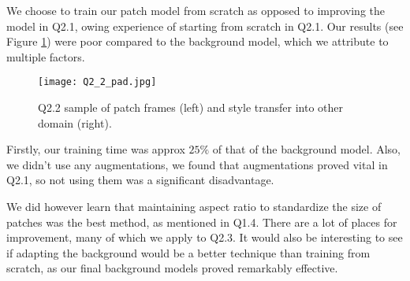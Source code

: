 We choose to train our patch model from scratch as opposed to improving the model in Q2.1, owing experience of starting from scratch in Q2.1.
Our results (see Figure \ref{fig:Q2_2}) were poor compared to the background model, which we attribute to multiple factors.
\begin{figure}[h!]
  \begin{center}
  \texttt{[image: Q2\_2\_pad.jpg]}
    \caption{Q2.2 sample of patch frames (left) and style transfer into other domain (right).}
    \label{fig:Q2_2}
  \end{center}
  \end{figure}

Firstly, our training time was approx $25\%$ of that of the background model.
Also, we didn't use any augmentations, we found that augmentations proved vital in Q2.1, so not using them was a significant disadvantage.

We did however learn that maintaining aspect ratio to standardize the size of patches was the best method, as mentioned in Q1.4.
There are a lot of places for improvement, many of which we apply to Q2.3.
It would also be interesting to see if adapting the background would be a better technique than training from scratch, as our final background models proved remarkably effective.
